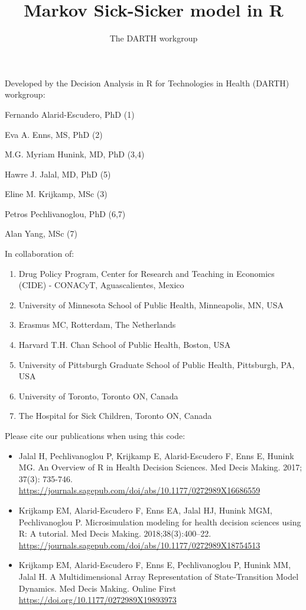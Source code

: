 \documentclass[
]{article}
\title{Markov Sick-Sicker model in R}
\author{The DARTH workgroup}
\date{}
\providecommand{\tightlist}{%
  \setlength{\itemsep}{0pt}\setlength{\parskip}{0pt}}
\begin{document}
\maketitle

Developed by the Decision Analysis in R for Technologies in Health
(DARTH) workgroup:

Fernando Alarid-Escudero, PhD (1)

Eva A. Enns, MS, PhD (2)

M.G. Myriam Hunink, MD, PhD (3,4)

Hawre J. Jalal, MD, PhD (5)

Eline M. Krijkamp, MSc (3)

Petros Pechlivanoglou, PhD (6,7)

Alan Yang, MSc (7)

In collaboration of:

\begin{enumerate}
\def\labelenumi{\arabic{enumi}.}
\tightlist
\item
  Drug Policy Program, Center for Research and Teaching in Economics
  (CIDE) - CONACyT, Aguascalientes, Mexico
\item
  University of Minnesota School of Public Health, Minneapolis, MN, USA
\item
  Erasmus MC, Rotterdam, The Netherlands
\item
  Harvard T.H. Chan School of Public Health, Boston, USA
\item
  University of Pittsburgh Graduate School of Public Health, Pittsburgh,
  PA, USA
\item
  University of Toronto, Toronto ON, Canada
\item
  The Hospital for Sick Children, Toronto ON, Canada
\end{enumerate}

Please cite our publications when using this code:

\begin{itemize}
\item
  Jalal H, Pechlivanoglou P, Krijkamp E, Alarid-Escudero F, Enns E,
  Hunink MG. An Overview of R in Health Decision Sciences. Med Decis
  Making. 2017; 37(3): 735-746.
  \url{https://journals.sagepub.com/doi/abs/10.1177/0272989X16686559}
\item
  Krijkamp EM, Alarid-Escudero F, Enns EA, Jalal HJ, Hunink MGM,
  Pechlivanoglou P. Microsimulation modeling for health decision
  sciences using R: A tutorial. Med Decis Making. 2018;38(3):400--22.
  \url{https://journals.sagepub.com/doi/abs/10.1177/0272989X18754513}
\item
  Krijkamp EM, Alarid-Escudero F, Enns E, Pechlivanoglou P, Hunink MM,
  Jalal H. A Multidimensional Array Representation of State-Transition
  Model Dynamics. Med Decis Making. Online First
  \url{https://doi.org/10.1177/0272989X19893973}
\end{itemize}
\end{document}
